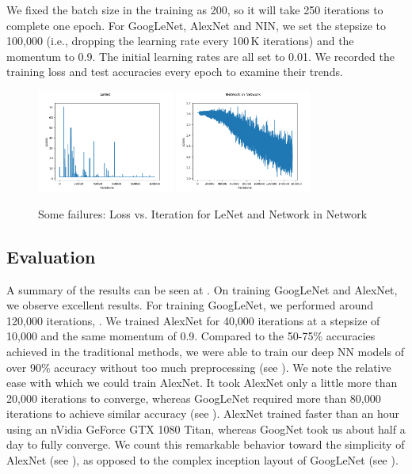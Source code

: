 We fixed the batch size in the training as 200, so it will take 250 iterations to 
complete one epoch. For GoogLeNet, AlexNet and NIN, we set the stepsize to 100,000 (i.e., dropping 
the learning rate every 100\,K iterations) and the momentum to 0.9. The initial 
learning rates are all set to 0.01. We recorded the training loss and test accuracies 
every epoch to examine their trends. 

\begin{figure}[t]
\centering
\includegraphics[width=0.4\textwidth]{lenet_loss.png}
\includegraphics[width=0.4\textwidth]{nin_loss.png}
\caption{Some failures: Loss vs. Iteration for LeNet and Network in Network}
\label{failed_losses}
\end{figure}

\subsection{Evaluation}
A summary of the results can be seen at . 
On training GoogLeNet and AlexNet, we observe excellent results. For training GoogLeNet, we performed around 120,000 iterations, . We trained AlexNet for 40,000 iterations at a stepsize of 10,000 and the same momentum of 0.9. Compared to the 50-75\% accuracies achieved in the traditional methods, we were able to train our deep NN models of over 90\% accuracy without too much preprocessing (see ). We note the relative ease with which we could train AlexNet. It took AlexNet only a little more than 20,000 iterations to converge, whereas GoogLeNet required more than 80,000 iterations to achieve similar accuracy (see ). AlexNet trained faster than an hour using an nVidia GeForce GTX 1080 Titan, whereas GoogNet took us about half a day to fully converge. We count this remarkable behavior toward the simplicity of AlexNet (see ), as opposed to the complex inception layout of GoogLeNet (see ). 

